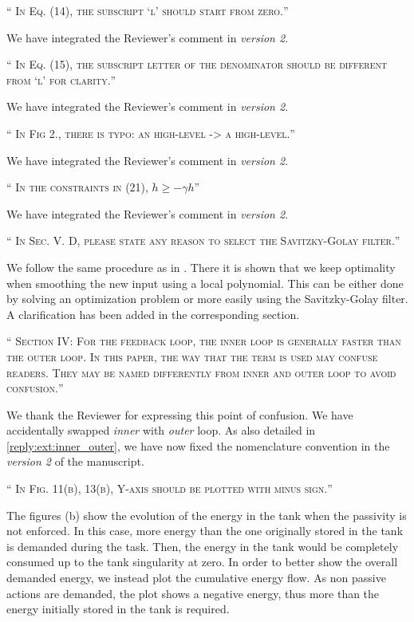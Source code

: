 \documentclass[10pt]{article}
\newcommand{\referee}[1]{\;
  \begin{minipage}[t]{.95\textwidth}
    ``{\small\color{red} \textsc{#1}}''
  \end{minipage}\medskip
  }
\newcommand{\version}[1]{\textit{version #1}}
\begin{document}
\begin{enumerate}[label={[R2:\,\arabic{enumi}]}]
\item\label{reply:R2:15} 
\referee{In Eq. (14), the subscript `l' should start from zero.}

We have integrated the Reviewer's comment in \version{2}.

\item\label{reply:R2:16} 
\referee{In Eq. (15), the subscript letter of the denominator should be different from `l' for clarity.}

We have integrated the Reviewer's comment in \version{2}.

\item\label{reply:R2:17} 
\referee{In Fig 2., there is  typo: an high-level -> a high-level.}

We have integrated the Reviewer's comment in \version{2}.

\item\label{reply:R2:18} 
\referee{In the constraints in (21), $\dot{h} \geq - \gamma h$}

We have integrated the Reviewer's comment in \version{2}.

\item\label{reply:R2:19} 
\referee{In Sec. V. D, please state any reason to select the Savitzky-Golay filter.}

We follow the same procedure as in \cite{williams_information-theoretic_2018}. There it is shown that we keep optimality when smoothing the new input using a local polynomial. This can be either done by solving an optimization problem or more easily using the Savitzky-Golay filter. A clarification has been added in the corresponding section. 

\item\label{reply:R2:20} 
\referee{Section IV: For the feedback loop, the inner loop is generally faster than the outer loop. In this paper, the way that the term is used may confuse readers. They may be named differently from inner and outer loop to avoid confusion.}

We thank the Reviewer for expressing this point of confusion. We have accidentally swapped \emph{inner} with \emph{outer} loop. As also detailed in \ref{reply:ext:inner_outer}, we have now fixed the nomenclature convention in the \version{2} of the manuscript.

\item\label{reply:R2:21} 
\referee{In Fig. 11(b), 13(b), Y-axis should be plotted with minus sign.}

The figures (b) show the evolution of the energy in the tank when the passivity is not enforced. In this case, more energy than the one originally stored in the tank is demanded during the task. Then, the energy in the tank would be completely consumed up to the tank singularity at zero. In order to better show the overall demanded energy, we instead plot the cumulative energy flow. As non passive actions are demanded, the plot shows a negative energy, thus more than the energy initially stored in the tank is required.


\end{enumerate}
\end{document}
